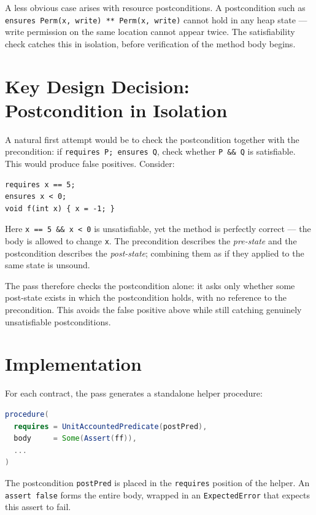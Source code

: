\documentclass[9pt,a4paper,twocolumn]{article}
\begin{document}
A less obvious case arises with resource postconditions. A
postcondition such as \texttt{ensures Perm(x, write) **
Perm(x, write)} cannot hold in any heap state — write permission
on the same location cannot appear twice. The satisfiability
check catches this in isolation, before verification of the method
body begins.

\section{Key Design Decision: Postcondition in Isolation}

A natural first attempt would be to check the postcondition
together with the precondition: if \texttt{requires P; ensures Q},
check whether \texttt{P \&\& Q} is satisfiable. This would produce
false positives. Consider:

\begin{lstlisting}
requires x == 5;
ensures x < 0;
void f(int x) { x = -1; }
\end{lstlisting}

Here \texttt{x == 5 \&\& x < 0} is unsatisfiable, yet the method
is perfectly correct — the body is allowed to change \texttt{x}.
The precondition describes the \emph{pre-state} and the
postcondition describes the \emph{post-state}; combining them as
if they applied to the same state is unsound.

The pass therefore checks the postcondition alone: it asks only
whether some post-state exists in which the postcondition holds,
with no reference to the precondition. This avoids the false
positive above while still catching genuinely unsatisfiable
postconditions.

\section{Implementation}

For each contract, the pass generates a standalone helper
procedure:

\begin{lstlisting}[language=Scala]
procedure(
  requires = UnitAccountedPredicate(postPred),
  body     = Some(Assert(ff)),
  ...
)
\end{lstlisting}

The postcondition \texttt{postPred} is placed in the
\texttt{requires} position of the helper. An \texttt{assert false}
forms the entire body, wrapped in an \texttt{ExpectedError} that
expects this assert to fail.
\end{document}
